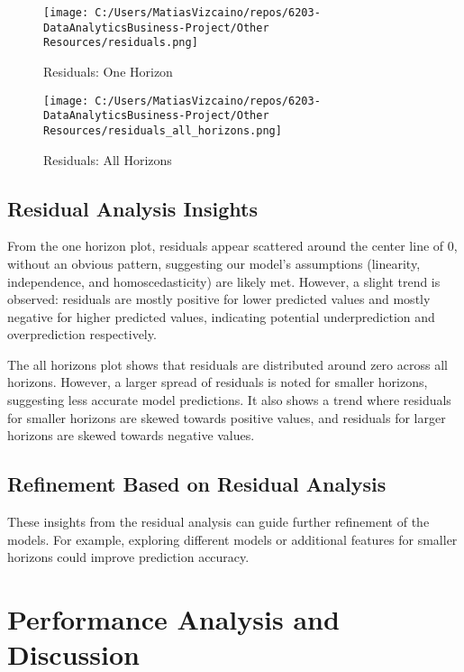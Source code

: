 \documentclass{article}
\begin{document}
  \begin{figure}[htbp]
    \begin{minipage}{0.5\textwidth}
    \centering
    \texttt{[image: C:/Users/MatiasVizcaino/repos/6203-DataAnalyticsBusiness-Project/Other Resources/residuals.png]}
    \caption{Residuals: One Horizon}
    \label{fig:residual-one-horizon}
    \end{minipage}
    \begin{minipage}{0.45\textwidth}
    \centering
    \texttt{[image: C:/Users/MatiasVizcaino/repos/6203-DataAnalyticsBusiness-Project/Other Resources/residuals\_all\_horizons.png]}
    \caption{Residuals: All Horizons}
    \label{fig:residual-all-horizons}
    \end{minipage}
    \end{figure}

\subsection{Residual Analysis Insights}
From the one horizon plot, residuals appear scattered around the center line of 0, without an obvious pattern, suggesting our model's assumptions (linearity, independence, and homoscedasticity) are likely met. However, a slight trend is observed: residuals are mostly positive for lower predicted values and mostly negative for higher predicted values, indicating potential underprediction and overprediction respectively.

The all horizons plot shows that residuals are distributed around zero across all horizons. However, a larger spread of residuals is noted for smaller horizons, suggesting less accurate model predictions. It also shows a trend where residuals for smaller horizons are skewed towards positive values, and residuals for larger horizons are skewed towards negative values.

\subsection{Refinement Based on Residual Analysis}
These insights from the residual analysis can guide further refinement of the models. For example, exploring different models or additional features for smaller horizons could improve prediction accuracy.

\section{Performance Analysis and Discussion}
\end{document}

